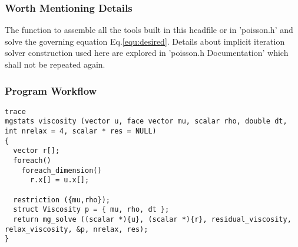 \documentclass[a4paper]{article}
\newcommand{\func}[1]{\textbf{\textcolor{function}{#1}}}
\newcommand{\para}[1]{\textbf{\emph{\textcolor{para}{#1}}}}
\begin{document}
\subsubsection{Worth Mentioning Details}
The function to assemble all the tools built in this headfile or in 'poisson.h' and solve the governing equation Eq.\ref{equ:desired}. Details about implicit iteration solver construction used here are explored in 'poisson.h Documentation' which shall not be repeated again.

\subsubsection{Program Workflow}
\begin{multicols}{2}
  \columnbreak
  \begin{verbatim}
trace
mgstats viscosity (vector u, face vector mu, scalar rho, double dt, int nrelax = 4, scalar * res = NULL)
{
  vector r[];
  foreach()
    foreach_dimension()
      r.x[] = u.x[];

  restriction ({mu,rho});
  struct Viscosity p = { mu, rho, dt };
  return mg_solve ((scalar *){u}, (scalar *){r}, residual_viscosity, relax_viscosity, &p, nrelax, res);
}
  \end{verbatim}
\end{multicols}
\end{document}
